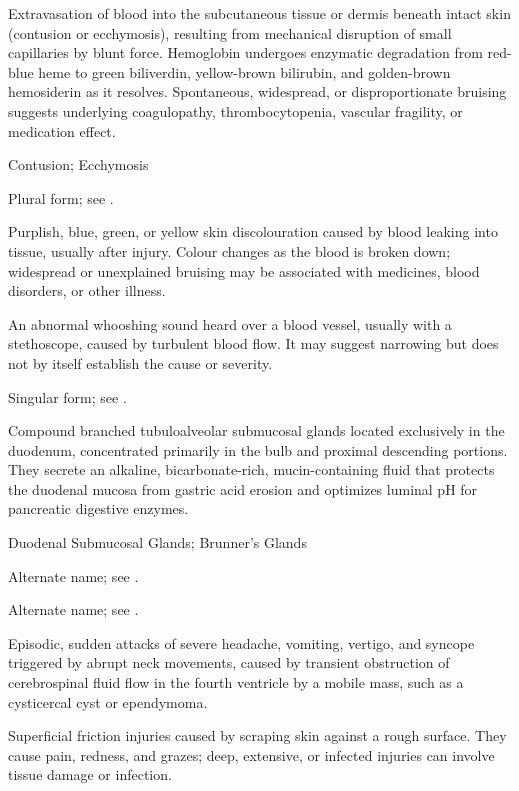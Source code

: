  Extravasation of blood into the subcutaneous tissue or dermis beneath intact skin (contusion or ecchymosis), resulting from mechanical disruption of small capillaries by blunt force. Hemoglobin undergoes enzymatic degradation from red-blue heme to green biliverdin, yellow-brown bilirubin, and golden-brown hemosiderin as it resolves. Spontaneous, widespread, or disproportionate bruising suggests underlying coagulopathy, thrombocytopenia, vascular fragility, or medication effect.

\synonyms
Contusion; Ecchymosis

 Plural form; see .

 Purplish, blue, green, or yellow skin discolouration caused by blood leaking into tissue, usually after injury. Colour changes as the blood is broken down; widespread or unexplained bruising may be associated with medicines, blood disorders, or other illness.

 An abnormal whooshing sound heard over a blood vessel, usually with a stethoscope, caused by turbulent blood flow. It may suggest narrowing but does not by itself establish the cause or severity.

 Singular form; see .

 Compound branched tubuloalveolar submucosal glands located exclusively in the duodenum, concentrated primarily in the bulb and proximal descending portions. They secrete an alkaline, bicarbonate-rich, mucin-containing fluid that protects the duodenal mucosa from gastric acid erosion and optimizes luminal pH for pancreatic digestive enzymes.

\synonyms
Duodenal Submucosal Glands; Brunner's Glands

 Alternate name; see .

 Alternate name; see .

 Episodic, sudden attacks of severe headache, vomiting, vertigo, and syncope triggered by abrupt neck movements, caused by transient obstruction of cerebrospinal fluid flow in the fourth ventricle by a mobile mass, such as a cysticercal cyst or ependymoma.

 Superficial friction injuries caused by scraping skin against a rough surface. They cause pain, redness, and grazes; deep, extensive, or infected injuries can involve tissue damage or infection.

